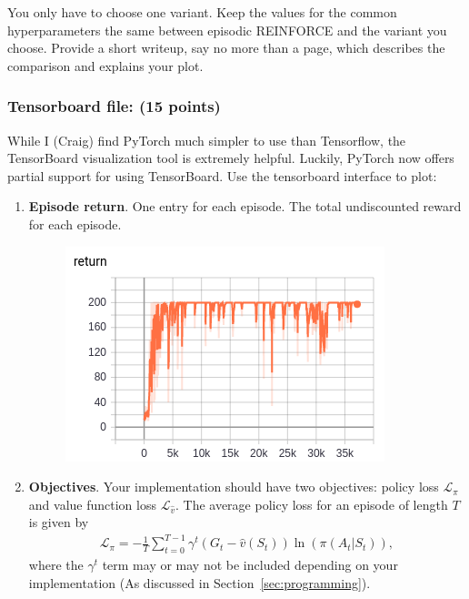 \documentclass{article}
\begin{document}
You only have to choose one variant. Keep the values for the common hyperparameters the same between episodic REINFORCE and the variant you choose. Provide a short writeup, say no more than a page, which describes the comparison and explains your plot.


\subsubsection{Tensorboard file: (15 points)}

While I (Craig) find PyTorch much simpler to use than Tensorflow, the TensorBoard visualization tool is extremely helpful. Luckily, PyTorch now offers partial support for using TensorBoard. Use the tensorboard interface to plot:

\begin{enumerate}
    \item \textbf{Episode return}. One entry for each episode. The total undiscounted reward for each episode.
    
    \begin{figure}[H]
    \begin{center}
    \centerline{\includegraphics[height=\imgheight]{img/tb_return.png}}
    \end{center}
    \end{figure}
    
    \item \textbf{Objectives}. Your implementation should have two objectives: policy loss $\mathcal{L}_\pi$ and value function loss $\mathcal{L}_{\hat{v}}$. The average policy loss for an episode of length $T$ is given by 
    \begin{align*}
        \mathcal{L}_{\pi} = -\frac{1}{T}\sum_{t=0}^{T-1}\gamma^t(G_t - \hat{v}(S_t))\ln(\pi(A_t|S_t)),
    \end{align*}
    where the $\gamma^t$ term may or may not be included depending on your implementation (As discussed in Section~\ref{sec:programming}).
    

\end{enumerate}
\end{document}
